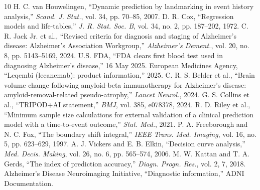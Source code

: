 \documentclass[conference]{IEEEtran}
\begin{document}
\begin{thebibliography}{10}\footnotesize
{} H. C. van Houwelingen, ``Dynamic prediction by landmarking in event history analysis,'' \emph{Scand. J. Stat.}, vol. 34, pp. 70--85, 2007.
 D. R. Cox, ``Regression models and life-tables,'' \emph{J. R. Stat. Soc. B}, vol. 34, no. 2, pp. 187--202, 1972.
 C. R. Jack Jr. et al., ``Revised criteria for diagnosis and staging of Alzheimer's disease: Alzheimer's Association Workgroup,'' \emph{Alzheimer's Dement.}, vol. 20, no. 8, pp. 5143--5169, 2024.
 U.S. FDA, ``FDA clears first blood test used in diagnosing Alzheimer's disease,'' 16 May 2025.
 European Medicines Agency, ``Leqembi (lecanemab): product information,'' 2025.
 C. R. S. Belder et al., ``Brain volume change following amyloid-beta immunotherapy for Alzheimer's disease: amyloid-removal-related pseudo-atrophy,'' \emph{Lancet Neurol.}, 2024.
 G. S. Collins et al., ``TRIPOD+AI statement,'' \emph{BMJ}, vol. 385, e078378, 2024.
 R. D. Riley et al., ``Minimum sample size calculations for external validation of a clinical prediction model with a time-to-event outcome,'' \emph{Stat. Med.}, 2021.
 P. A. Freeborough and N. C. Fox, ``The boundary shift integral,'' \emph{IEEE Trans. Med. Imaging}, vol. 16, no. 5, pp. 623--629, 1997.
 A. J. Vickers and E. B. Elkin, ``Decision curve analysis,'' \emph{Med. Decis. Making}, vol. 26, no. 6, pp. 565--574, 2006.
 M. W. Kattan and T. A. Gerds, ``The index of prediction accuracy,'' \emph{Diagn. Progn. Res.}, vol. 2, 7, 2018.
 Alzheimer's Disease Neuroimaging Initiative, ``Diagnostic information,'' ADNI Documentation.
\end{thebibliography}
\end{document}
